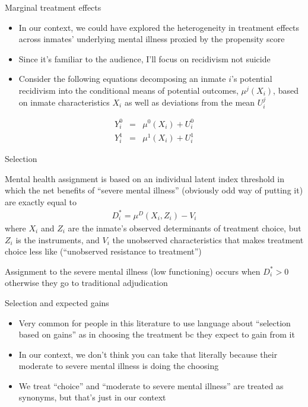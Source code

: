 \documentclass{beamer}
\begin{document}
\begin{frame}{Marginal treatment effects}

\begin{itemize}
\item In our context, we could have explored the heterogeneity in treatment effects across inmates' underlying mental illness proxied by the propensity score
\item Since it's familiar to the audience, I'll focus on recidivism not suicide
\item Consider the following equations decomposing an inmate $i$'s potential recidivism into the conditional means of potential outcomes, $\mu^j(X_i)$, based on inmate characteristics $X_i$ as well as deviations from the mean $U_i^j$
\end{itemize}

\begin{eqnarray*}
Y_i^0 &=& \mu^0(X_i) + U_i^0 \\
Y_i^1 &=& \mu^1(X_i) + U_i^1 
\end{eqnarray*}

\end{frame}

\begin{frame}{Selection}


Mental health assignment is based on an individual latent index threshold in which the net benefits of ``severe mental illness'' (obviously odd way of putting it) are exactly equal to
\bigskip
\begin{eqnarray*}
D_i^* = \mu^D(X_i,Z_i) - V_i
\end{eqnarray*}where $X_i$ and $Z_i$ are the inmate's observed determinants of treatment choice, but $Z_i$ is the instruments, and $V_i$ the unobserved characteristics that makes treatment choice less like (``unobserved resistance to treatment'')

\bigskip

Assignment to the severe mental illness (low functioning) occurs when $D_i^*>0$ otherwise they go to traditional adjudication

\end{frame}

\begin{frame}{Selection and expected gains}

\begin{itemize}
\item Very common for people in this literature to use language about ``selection based on gains'' as in choosing the treatment bc they expect to gain from it
\item In our context, we don't think you can take that literally because their moderate to severe mental illness is doing the choosing
\item We treat ``choice'' and ``moderate to severe mental illness'' are treated as synonyms, but that's just in our context
\end{itemize}

\end{frame}
\end{document}

